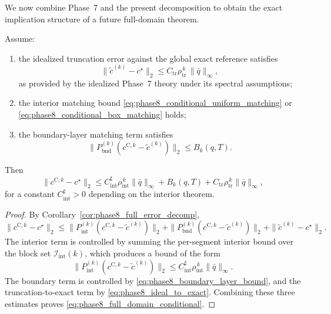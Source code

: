We now combine Phase~7 and the present decomposition to obtain the exact implication structure of a future full-domain theorem.

\begin{theorem}
\label{thm:phase8_conditional_full_domain}
Assume:
\begin{enumerate}
    \item the idealized truncation error against the global exact reference satisfies
    \begin{equation}
    \label{eq:phase8_ideal_to_exact}
    \|\tilde c^{(k)}-c^\star\|_2
    \le
    C_{\mathrm{tr}}\rho_{\mathrm{tr}}^{\,k}\,\|\bar q\|_\infty,
    \end{equation}
    as provided by the idealized Phase~7 theory under its spectral assumptions;
    \item the interior matching bound \eqref{eq:phase8_conditional_uniform_matching} or \eqref{eq:phase8_conditional_box_matching} holds;
    \item the boundary-layer matching term satisfies
    \begin{equation}
    \label{eq:phase8_boundary_layer_bound}
    \|P_{\mathrm{bnd}}^{(k)}(c^{\mathrm{C},k}-\tilde c^{(k)})\|_2
    \le
    B_k(q,T).
    \end{equation}
\end{enumerate}
Then
\begin{equation}
\label{eq:phase8_full_domain_conditional}
\|c^{\mathrm{C},k}-c^\star\|_2
\le
C_{\mathrm{int}}^{\sharp}\rho_{\mathrm{int}}^{\,k}\|\bar q\|_\infty
+
B_k(q,T)
+
C_{\mathrm{tr}}\rho_{\mathrm{tr}}^{\,k}\|\bar q\|_\infty,
\end{equation}
for a constant \(C_{\mathrm{int}}^{\sharp}>0\) depending on the interior theorem.
\end{theorem}

\begin{proof}
By Corollary~\ref{cor:phase8_full_error_decomp},
\[
\|c^{\mathrm{C},k}-c^\star\|_2
\le
\|P_{\mathrm{int}}^{(k)}(c^{\mathrm{C},k}-\tilde c^{(k)})\|_2
+
\|P_{\mathrm{bnd}}^{(k)}(c^{\mathrm{C},k}-\tilde c^{(k)})\|_2
+
\|\tilde c^{(k)}-c^\star\|_2.
\]
The interior term is controlled by summing the per-segment interior bound over the block set \(\mathcal I_{\mathrm{int}}(k)\), which produces a bound of the form
\[
\|P_{\mathrm{int}}^{(k)}(c^{\mathrm{C},k}-\tilde c^{(k)})\|_2
\le
C_{\mathrm{int}}^{\sharp}\rho_{\mathrm{int}}^{\,k}\|\bar q\|_\infty.
\]
The boundary term is controlled by \eqref{eq:phase8_boundary_layer_bound}, and the truncation-to-exact term by \eqref{eq:phase8_ideal_to_exact}.
Combining these three estimates proves \eqref{eq:phase8_full_domain_conditional}.
\end{proof}

